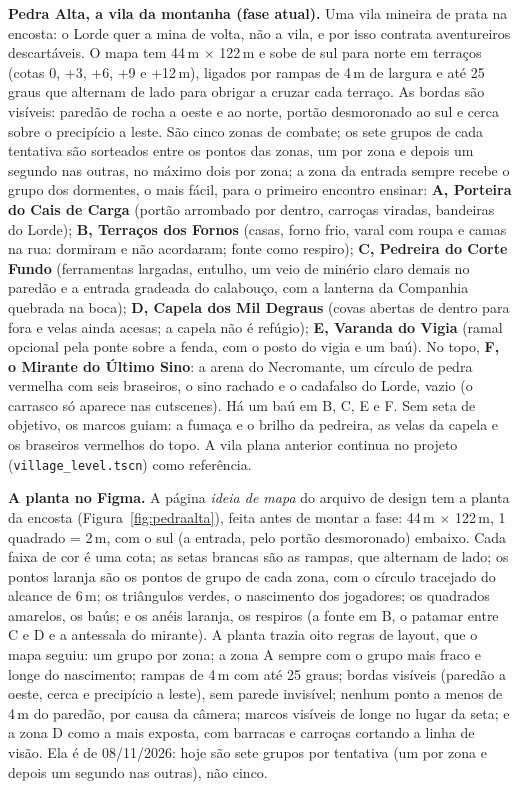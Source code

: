 \documentclass[11pt,a4paper]{article}
\begin{document}
\textbf{Pedra Alta, a vila da montanha (fase atual).} Uma vila mineira de prata na encosta: o Lorde quer a mina de volta, não a vila, e por isso contrata aventureiros descartáveis. O mapa tem 44\,m $\times$ 122\,m e sobe de sul para norte em terraços (cotas 0, +3, +6, +9 e +12\,m), ligados por rampas de 4\,m de largura e até 25 graus que alternam de lado para obrigar a cruzar cada terraço. As bordas são visíveis: paredão de rocha a oeste e ao norte, portão desmoronado ao sul e cerca sobre o precipício a leste. São cinco zonas de combate; os sete grupos de cada tentativa são sorteados entre os pontos das zonas, um por zona e depois um segundo nas outras, no máximo dois por zona; a zona da entrada sempre recebe o grupo dos dormentes, o mais fácil, para o primeiro encontro ensinar: \textbf{A, Porteira do Cais de Carga} (portão arrombado por dentro, carroças viradas, bandeiras do Lorde); \textbf{B, Terraços dos Fornos} (casas, forno frio, varal com roupa e camas na rua: dormiram e não acordaram; fonte como respiro); \textbf{C, Pedreira do Corte Fundo} (ferramentas largadas, entulho, um veio de minério claro demais no paredão e a entrada gradeada do calabouço, com a lanterna da Companhia quebrada na boca); \textbf{D, Capela dos Mil Degraus} (covas abertas de dentro para fora e velas ainda acesas; a capela não é refúgio); \textbf{E, Varanda do Vigia} (ramal opcional pela ponte sobre a fenda, com o posto do vigia e um baú). No topo, \textbf{F, o Mirante do Último Sino}: a arena do Necromante, um círculo de pedra vermelha com seis braseiros, o sino rachado e o cadafalso do Lorde, vazio (o carrasco só aparece nas cutscenes). Há um baú em B, C, E e F. Sem seta de objetivo, os marcos guiam: a fumaça e o brilho da pedreira, as velas da capela e os braseiros vermelhos do topo. A vila plana anterior continua no projeto (\texttt{village\_level.tscn}) como referência.

\textbf{A planta no Figma.} A página \emph{ideia de mapa} do arquivo de design tem a planta da encosta (Figura~\ref{fig:pedraalta}), feita antes de montar a fase: 44\,m $\times$ 122\,m, 1 quadrado = 2\,m, com o sul (a entrada, pelo portão desmoronado) embaixo. Cada faixa de cor é uma cota; as setas brancas são as rampas, que alternam de lado; os pontos laranja são os pontos de grupo de cada zona, com o círculo tracejado do alcance de 6\,m; os triângulos verdes, o nascimento dos jogadores; os quadrados amarelos, os baús; e os anéis laranja, os respiros (a fonte em B, o patamar entre C e D e a antessala do mirante). A planta trazia oito regras de layout, que o mapa seguiu: um grupo por zona; a zona A sempre com o grupo mais fraco e longe do nascimento; rampas de 4\,m com até 25 graus; bordas visíveis (paredão a oeste, cerca e precipício a leste), sem parede invisível; nenhum ponto a menos de 4\,m do paredão, por causa da câmera; marcos visíveis de longe no lugar da seta; e a zona D como a mais exposta, com barracas e carroças cortando a linha de visão. Ela é de 08/11/2026: hoje são sete grupos por tentativa (um por zona e depois um segundo nas outras), não cinco.
\end{document}
